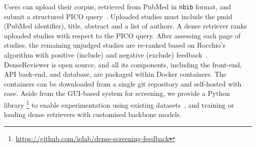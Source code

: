 Users can upload their corpus, retrieved from PubMed in \texttt{nbib} format, and submit a structured PICO query~\cite{scells2017integrating}. Uploaded studies must include the pmid (PubMed identifier), title, abstract and a list of authors. A dense retriever ranks uploaded studies with respect to the PICO query. After assessing each page of studies, the remaining unjudged studies are re-ranked based on Rocchio's algorithm with positive (include) and negative (exclude) feedback~\cite{mao2024dense}. DenseReviewer is open source, and all its components, including the front-end, API back-end, and database, are packaged within Docker containers. The containers can be downloaded from a single git repository and self-hosted with ease. Aside from the GUI-based system for screening, we provide a Python library%
\footnote{\url{https://github.com/ielab/dense-screening-feedback}} 
to enable experimentation using existing datasets~\cite{wang2022little,scells2017test,kanoulas2017clef,kanoulas2018clef,kanoulas2019clef}, and training or loading dense retrievers with customised backbone models.